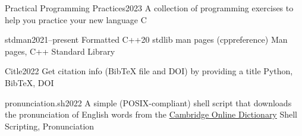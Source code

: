 %
%
%


\begin{projects}
	\project
	{Practical Programming Practices}{2023}
	{}
    {A collection of programming exercises to help you practice your new language}
	{C}

	\project
	{stdman}{2021--present}
	{}
    {Formatted C++20 stdlib man pages (cppreference)}
	{Man pages, C++ Standard Library}

	\project
	{Citle}{2022}
	{}
	{Get citation info (BibTeX file and DOI) by providing a title}
	{Python, BibTeX, DOI}

  \project
  {pronunciation.sh}{2022}
  {}
  {A simple (POSIX-compliant) shell script that downloads the pronunciation of English words from the \href{https://dictionary.cambridge.org}{Cambridge Online Dictionary}}
  {Shell Scripting, Pronunciation}


\end{projects}
